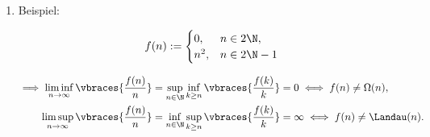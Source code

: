 \begin{solution}
\begin{enumerate}[label = (\alph*)]
  \item Beispiel:

  \begin{align*}
    f(n)
    :=
    \begin{cases}
      0,   & n \in 2 \N, \\
      n^2, & n \in 2 \N - 1
    \end{cases}
  \end{align*}

  \begin{align*}
    \implies
    \liminf_{n \to \infty}
    \vbraces
    {
      \frac{f(n)}{n}
    }
    & =
    \sup_{n \in \N}
    \inf_{k \geq n}
    \vbraces
    {
      \frac{f(k)}{k}
    }
    =
    0
    \iff
    f(n) \neq \Omega(n), \\
    \limsup_{n \to \infty}
    \vbraces
    {
      \frac{f(n)}{n}
    }
    & =
    \inf_{n \in \N}
    \sup_{k \geq n}
    \vbraces
    {
      \frac{f(k)}{k}
    }
    =
    \infty
    \iff
    f(n) \neq \Landau(n).
  \end{align*}

\end{enumerate}

\end{solution}

